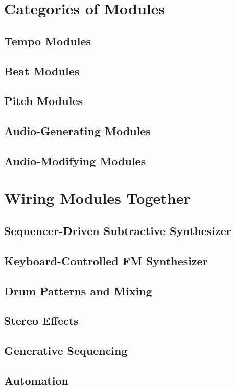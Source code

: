 \documentclass[11pt]{book}
\begin{document}
\section{Categories of Modules}

\subsection{Tempo Modules}
\subsection{Beat Modules}
\subsection{Pitch Modules}
\subsection{Audio-Generating Modules}
\subsection{Audio-Modifying Modules}


\section{Wiring Modules Together}
\subsection{Sequencer-Driven Subtractive Synthesizer}
\subsection{Keyboard-Controlled FM Synthesizer}
\subsection{Drum Patterns and Mixing}
\subsection{Stereo Effects}
\subsection{Generative Sequencing}
\subsection{Automation}
\end{document}
